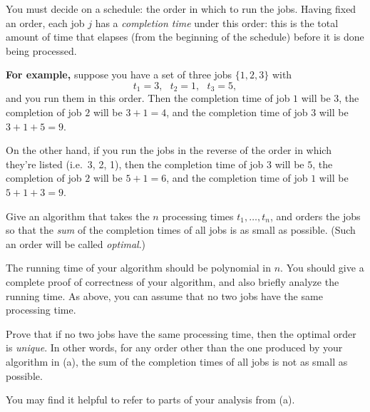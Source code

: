 \documentclass[12pt]{article}
\begin{document}
\begin{enumerate}
You must decide on a schedule:
the order in which to run the jobs.
Having fixed an order, each job $j$ has a
{\em completion time} under this order:
this is the total amount of time that elapses
(from the beginning of the schedule) before it is
done being processed.

\bigskip
{\bf For example,} suppose you have a set of three jobs $\{1, 2, 3\}$
with
$$t_1 = 3, ~~~ t_2 = 1, ~~~ t_3 = 5,$$
and you run them in this order.
Then the completion time of job $1$ will be $3$,
the completion of job $2$ will be $3 + 1 = 4$,
and the completion time of job $3$ will be $3 + 1 + 5 = 9$.

On the other hand, if you run the jobs in the reverse
of the order in which they're listed (i.e.~3, 2, 1), then
the completion time of job $3$ will be $5$,
the completion of job $2$ will be $5 + 1 = 6$,
and the completion time of job $1$ will be $5 + 1 + 3 = 9$.

\bigskip

Give an algorithm that takes the $n$ processing times
$t_1, \ldots, t_n$, and orders the jobs so that
the {\em sum} of the completion times of all jobs
is as small as possible.
(Such an order will be called {\em optimal}.)

The running time of your algorithm should be polynomial in $n$.
You should give a complete proof of correctness of your algorithm,
and also briefly analyze the running time.
As above, you can assume that no two jobs have the same processing time.

Prove that if no two jobs have the same processing time,
then the optimal order is {\em unique}.
In other words, for any order other than
the one produced by your algorithm in (a),
the sum of the completion times of all jobs
is not as small as possible.

You may find it helpful to refer to parts of your analysis from (a).

\end{enumerate}
\end{document}
